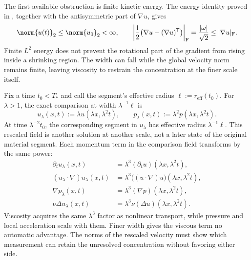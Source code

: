 The first available obstruction is finite kinetic energy. The energy identity proved in , together with the antisymmetric part of \(\nabla u\), gives
\[
  \norm{u(t)}_2
  \leq
  \norm{u_0}_2
  <\infty,
  \qquad
  \left|\frac12\bigl(\nabla u-(\nabla u)^{\mathsf T}\bigr)\right|_{\mathrm F}
  =
  \frac{|\omega|}{\sqrt2}
  \leq
  |\nabla u|_{\mathrm F}.
\]
Finite \(L^2\) energy does not prevent the rotational part of the gradient from rising inside a shrinking region. The width can fall while the global velocity norm remains finite, leaving viscosity to restrain the concentration at the finer scale itself.


Fix a time \(t_0<T_*\) and call the segment's effective radius \(\ell:=r_{\mathrm{eff}}(t_0)\). For \(\lambda>1\), the exact \NavierStokes{} comparison at width \(\lambda^{-1}\ell\) is
\[
  u_\lambda(x,t)
  :=
  \lambda u(\lambda x,\lambda^2t),
  \qquad
  p_\lambda(x,t)
  :=
  \lambda^2p(\lambda x,\lambda^2t).
\]
At time \(\lambda^{-2}t_0\), the corresponding segment in \(u_\lambda\) has effective radius \(\lambda^{-1}\ell\). This rescaled field is another solution at another scale, not a later state of the original material segment. Each momentum term in the comparison field transforms by the same power:
\[
\begin{aligned}
  \partial_tu_\lambda(x,t)
  &=
  \lambda^3(\partial_tu)(\lambda x,\lambda^2t),
  \\
  (u_\lambda\cdot\nabla)u_\lambda(x,t)
  &=
  \lambda^3\bigl((u\cdot\nabla)u\bigr)(\lambda x,\lambda^2t),
  \\
  \nabla p_\lambda(x,t)
  &=
  \lambda^3(\nabla p)(\lambda x,\lambda^2t),
  \\
  \nu\Delta u_\lambda(x,t)
  &=
  \lambda^3\nu(\Delta u)(\lambda x,\lambda^2t).
\end{aligned}
\]
Viscosity acquires the same \(\lambda^3\) factor as nonlinear transport, while pressure and local acceleration scale with them. Finer width gives the viscous term no automatic advantage. The norms of the rescaled velocity must show which measurement can retain the unresolved concentration without favoring either side.


